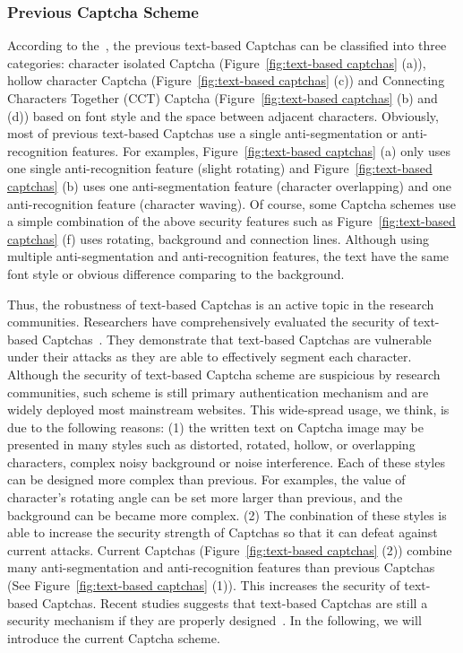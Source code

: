 \subsubsection{Previous Captcha Scheme}
According to the~\cite{Gao2016A}, the previous text-based Captchas can be classified into three categories: character isolated Captcha (Figure~\ref{fig:text-based captchas} (a)), hollow character Captcha (Figure~\ref{fig:text-based captchas} (c)) and Connecting Characters Together (CCT) Captcha (Figure~\ref{fig:text-based captchas} (b) and (d)) based on font style and the space between adjacent characters. Obviously, most of previous text-based Captchas use a single anti-segmentation or anti-recognition features. For examples, Figure~\ref{fig:text-based captchas} (a) only uses one single anti-recognition feature (slight rotating) and Figure~\ref{fig:text-based captchas} (b) uses one anti-segmentation feature (character overlapping) and one anti-recognition feature (character waving).
Of course, some Captcha schemes use a simple combination of the above security features such as Figure~\ref{fig:text-based captchas} (f) uses rotating, background and connection lines. Although using multiple anti-segmentation and anti-recognition features, the text have the same font style or obvious difference comparing to the background.

Thus, the robustness of text-based Captchas is an active topic in the research communities. Researchers have comprehensively evaluated the security of text-based Captchas~\cite{Bursztein2011Text,Bursztein2014The,Gao2016A}.
They demonstrate that text-based Captchas are vulnerable under their attacks as they are able to effectively segment each character. Although the security of text-based Captcha scheme are suspicious by research communities, such scheme is still primary authentication mechanism and are widely deployed most mainstream websites. This wide-spread usage, we think, is due to the following reasons:
(1) the written text on Captcha image may be presented in many styles such as distorted, rotated, hollow, or overlapping characters, complex noisy background or noise interference.
Each of these styles can be designed more complex than previous. For examples, the value of character's rotating angle can be set more larger than previous, and the background can be became more complex.
(2) The conbination of these styles is able to increase the security strength of Captchas so that it can defeat against current attacks. Current Captchas (Figure~\ref{fig:text-based captchas} (2)) combine many anti-segmentation and anti-recognition features than previous Captchas (See Figure~\ref{fig:text-based captchas} (1)). This increases the security of text-based Captchas. Recent studies suggests that text-based Captchas are still a security mechanism if they are properly designed~\cite{Thomas2013Trafficking,Bursztein2014Easy}. In the following, we will introduce the current Captcha scheme.

